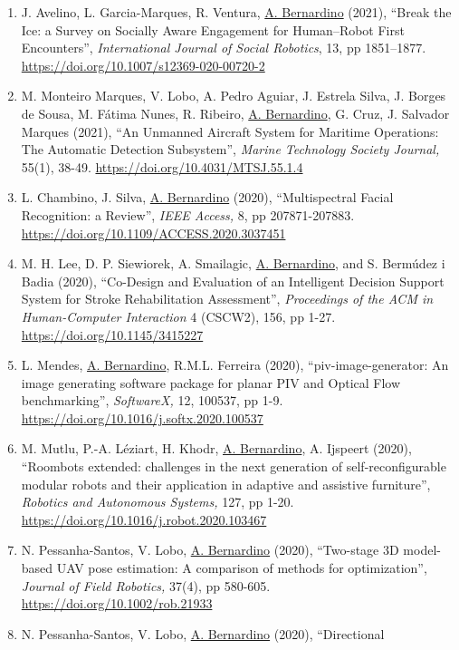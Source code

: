 \begin{enumerate}
  \emph{Journal of Intelligent \& Robotic Systems,} 102, 52, pp 1-24.
  \url{https://doi.org/10.1007/s10846-021-01409-y}
\item
  J. Avelino, L. Garcia-Marques, R. Ventura, \ul{A. Bernardino} (2021),
  ``Break the Ice: a Survey on Socially Aware Engagement for
  Human--Robot First Encounters'', \emph{International Journal of Social
  Robotics}, 13, pp 1851--1877.
  \url{https://doi.org/10.1007/s12369-020-00720-2}~
\item
  M. Monteiro Marques, V. Lobo, A. Pedro Aguiar, J. Estrela Silva, J.
  Borges de Sousa, M. Fátima Nunes, R. Ribeiro, \ul{A. Bernardino}, G.
  Cruz, J. Salvador Marques (2021), ``An Unmanned Aircraft System for
  Maritime Operations: The Automatic Detection Subsystem'', \emph{Marine
  Technology Society Journal,} 55(1), 38-49.
  \url{https://doi.org/10.4031/MTSJ.55.1.4}~
\item
  L. Chambino, J. Silva, \ul{A. Bernardino} (2020), ``Multispectral
  Facial Recognition: a Review'', \emph{IEEE Access,} 8, pp
  207871-207883. \url{https://doi.org/10.1109/ACCESS.2020.3037451}~
\item
  M. H. Lee, D. P. Siewiorek, A. Smailagic, \ul{A. Bernardino}, and S.
  Bermúdez i Badia (2020), ``Co-Design and Evaluation of an Intelligent
  Decision Support System for Stroke Rehabilitation Assessment'',
  \emph{Proceedings of the ACM in Human-Computer Interaction} 4 (CSCW2),
  156, pp 1-27. \url{https://doi.org/10.1145/3415227}~
\item
  L. Mendes, \ul{A. Bernardino}, R.M.L. Ferreira (2020),
  ``piv-image-generator: An image generating software package for planar
  PIV and Optical Flow benchmarking'', \emph{SoftwareX,} 12, 100537, pp
  1-9. \url{https://doi.org/10.1016/j.softx.2020.100537}~
\item
  M. Mutlu, P.-A. Léziart, H. Khodr, \ul{A. Bernardino}, A. Ijspeert
  (2020), ``Roombots extended: challenges in the next generation of
  self-reconfigurable modular robots and their application in adaptive
  and assistive furniture'', \emph{Robotics and Autonomous Systems,}
  127, pp 1-20. \url{https://doi.org/10.1016/j.robot.2020.103467}~
\item
  N. Pessanha-Santos, V. Lobo, \ul{A. Bernardino} (2020), ``Two-stage 3D
  model-based UAV pose estimation: A comparison of methods for
  optimization'', \emph{Journal of Field Robotics,} 37(4), pp 580-605.
  \url{https://doi.org/10.1002/rob.21933}~
\item
  N. Pessanha-Santos, V. Lobo, \ul{A. Bernardino} (2020), ``Directional

\end{enumerate}
